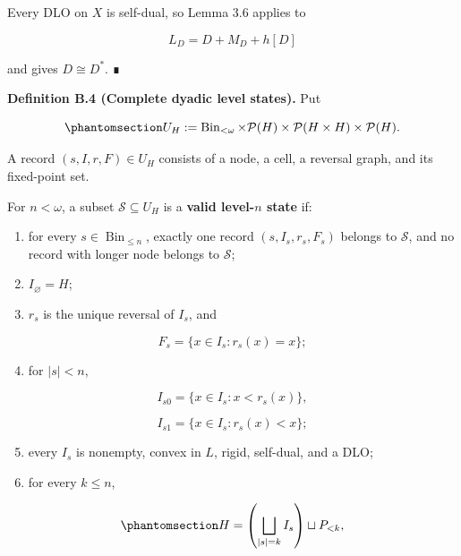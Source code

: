 \documentclass[
  english,
  11pt,
  reqno]{amsart}
\newcounter{none} %
\providecommand{\tightlist}{%
  \setlength{\itemsep}{0pt}\setlength{\parskip}{0pt}}
\begin{document}
Every DLO on \(X\) is self-dual, so Lemma 3.6 applies to

\[
L_D=D+M_D+h[D]
\]

and gives \(D\cong D^*\). ∎

\protect{}\label{def:b-4-level-state}

\textbf{Definition B.4 (Complete dyadic level states).} Put

\begin{equation}\protect\phantomsection\label{eq:typefree-tree-record-space}{
U_H
:=
\operatorname{Bin}_{<\omega}
\times
\mathcal P(H)
\times
\mathcal P(H\times H)
\times
\mathcal P(H).
}\end{equation}

A record \((s,I,r,F)\in U_H\) consists of a node, a cell, a reversal
graph, and its fixed-point set.

For \(n<\omega\), a subset \(\mathcal S\subseteq U_H\) is a
\textbf{valid level-\(n\) state} if:

\begin{enumerate}
\tightlist
\item
  for every \(s\in\operatorname{Bin}_{\le n}\), exactly one record
  \((s,I_s,r_s,F_s)\) belongs to \(\mathcal S\), and no record with
  longer node belongs to \(\mathcal S\);
\item
  \(I_\varnothing=H\);
\item
  \(r_s\) is the unique reversal of \(I_s\), and
\end{enumerate}

\[
   F_s=\{x\in I_s:r_s(x)=x\};
\]

\begin{enumerate}
\setcounter{enumi}{3}
\tightlist
\item
  for \(|s|<n\),
\end{enumerate}

\[
   I_{s0}=\{x\in I_s:x<r_s(x)\},
\]

\[
   I_{s1}=\{x\in I_s:r_s(x)<x\};
\]

\begin{enumerate}
\setcounter{enumi}{4}
\tightlist
\item
  every \(I_s\) is nonempty, convex in \(L\), rigid, self-dual, and a
  DLO;
\item
  for every \(k\le n\),
\end{enumerate}

\begin{equation}\protect\phantomsection\label{eq:typefree-level-partition}{
   H
   =
   \left(\bigsqcup_{|s|=k}I_s\right)
   \sqcup
   P_{<k},
}\end{equation}
\end{document}

